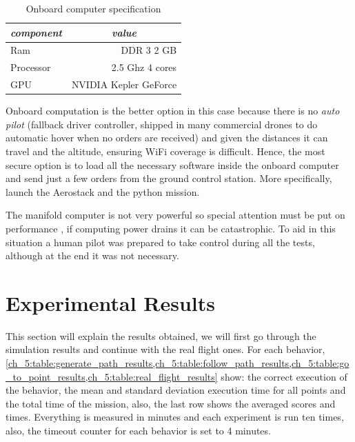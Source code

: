     \begin{table}[!h]
      \centering
      \begin{tabular}{lr} \toprule
        \multicolumn{1}{c}{\textit{component}} & \multicolumn{1}{c}{\textit{value}}   \\ \midrule
        Ram           & DDR 3 2 GB     \\
        Processor     & 2.5 Ghz 4 cores \\
        GPU           & NVIDIA Kepler GeForce \\ \bottomrule
        \hline
      \end{tabular}
      \caption{Onboard computer specification}
      \label{ch_5:table:manifold_specs}
    \end{table}

    Onboard computation is the better option in this case because there is no \textit{auto pilot} (fallback driver controller, shipped in many commercial drones to do automatic hover when no orders are received) and given the distances it can travel and the altitude, ensuring WiFi coverage is difficult. Hence, the most secure option is to load all the necessary software inside the onboard computer and send just a few orders from the ground control station. More specifically, launch the Aerostack and the python mission.

    The manifold computer is not very powerful so special attention must be put on performance , if computing power drains it can be catastrophic. To aid in this situation a human pilot was prepared to take control during all the tests, although at the end it was not necessary.

\section{Experimental Results} \label{ch_5:sect:results}

  This section will explain the results obtained, we will first go through the simulation results and continue with the real flight ones. For each behavior, \cref{ch_5:table:generate_path_results,ch_5:table:follow_path_results,ch_5:table:go_to_point_results,ch_5:table:real_flight_results} show: the correct execution of the behavior, the mean and standard deviation execution time for all points and the total time of the mission, also, the last row shows the averaged scores and times. Everything is measured in minutes and each experiment is run ten times, also, the timeout counter for each behavior is set to 4 minutes.
 
